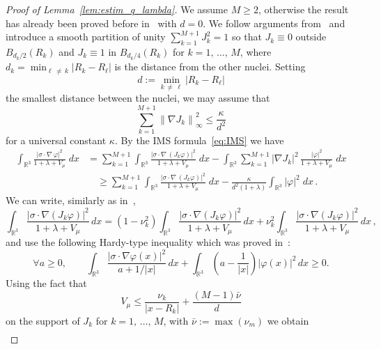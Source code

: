 \documentclass[AHL,Unicode,published]{cedram}
\newcommand{\R}{\mathbb{R}}
\newcommand\1{{\ensuremath {\mathds 1} }}
\renewcommand\phi{\varphi}
\renewcommand{\geq}{\geqslant}
\renewcommand{\leq}{\leqslant}
\let\oldforall\forall
\renewcommand*{\forall}{\mathrel{\oldforall}}
\begin{document}
\begin{proof}[Proof of Lemma~\ref{lem:estim_q_lambda}]
We assume $M\geq2$, otherwise the result has already been proved before in~\cite{DolEstSer-00} with $d=0$. We follow arguments from~\cite{BosDolEst-08} and introduce a smooth partition of unity $\sum_{k=1}^{M+1}J_k^2=1$ so that $J_k\equiv 0$ outside $ B_{d_k/2}(R_k) $ and $J_k \equiv 1$ in $B_{d_k/4}(R_k)$ for $k=1,\,\dots,\,M$, where $d_k=\min_{\ell\,\neq\,k}|R_k-R_\ell|$ is the distance from the other nuclei. Setting
\[
d:=\min_{k\,\neq\,\ell}\left|R_k-R_\ell\right|
\]
the smallest distance between the nuclei, we may assume that
\begin{equation}\label{est-gradients}
\sum_{k=1}^{M+1} \left\|\nabla J_k\right\|_\infty^2 \le \frac{\kappa}{d^2}
\end{equation}
for a universal constant $\kappa$. By the IMS formula~\eqref{eq:IMS} we have
\begin{align*}\label{decompos}
\int_{{\R^3}}\frac{\left|\sigma\cdot\nabla\,\phi\right|^2}{1+\lambda+V_\mu}\;dx&= \sum_{k=1}^{M+1} \int_{{\R^3}} \frac{\left|\sigma \cdot \nabla\,\left(J_k \phi\right)\right|^2}{1+\lambda+V_\mu}\;dx-\int_{{\R^3}} \sum_{k=1}^{M+1}\left|\nabla J_k\right|^2\,\frac{|\phi|^2}{1+\lambda+V_\mu}\;dx\\
&\quad\geq \sum_{k=1}^{M+1} \int_{{\R^3}} \frac{\left|\sigma \cdot \nabla\,(J_k \phi)\right|^2}{1+\lambda+V_\mu}\;dx-\frac\kappa{d^2(1+\lambda)}\int_{{\R^3}}|\phi|^2\;dx\,.
\end{align*}
We can write, similarly as in~\cite[Section~1.4]{EstLewSer-19},
\[
\int_{\R^3}\frac{\left|\sigma\cdot \nabla \left(J_k\phi\right)\right|^2}{1+\lambda+V_\mu}\,dx=\left(1-\nu_k^2\right)\int_{\R^3}\frac{\left|\sigma\cdot \nabla \left(J_k\phi\right)\right|^2}{1+\lambda+V_\mu}\,dx+\nu_k^2\int_{\R^3}\frac{\left|\sigma\cdot \nabla \left(J_k\phi\right)\right|^2}{1+\lambda+V_\mu}\,dx\,,
\]
and use the following Hardy-type inequality which was proved in~\cite{DolEstLosVeg-04,DolEstSer-00}:
\begin{equation}\label{eq:Hardy-type2}
\forall a\geq0,\qquad \int_{\R^3}\frac{\left|\sigma\cdot \nabla\phi(x)\right|^2}{a+1/|x|}\,dx+\int_{\R^3}\left(a-\frac{1}{|x|}\right)|\phi(x)|^2\,dx\geq0.
\end{equation}
Using the fact that
\[
V_\mu \leq \frac{\nu_k}{\left|x-R_k\right|}+\frac{(M-1)\bar\nu}{d}
\]
on the support of $J_k$ for $k=1,\,\dots,\,M$, with $\bar\nu:=\max(\nu_m)$ we obtain
\begin{equation}\label{eq:estim_kinetic_potential}
\begin{aligned}

\end{aligned}
\end{equation}
\end{proof}
\end{document}
